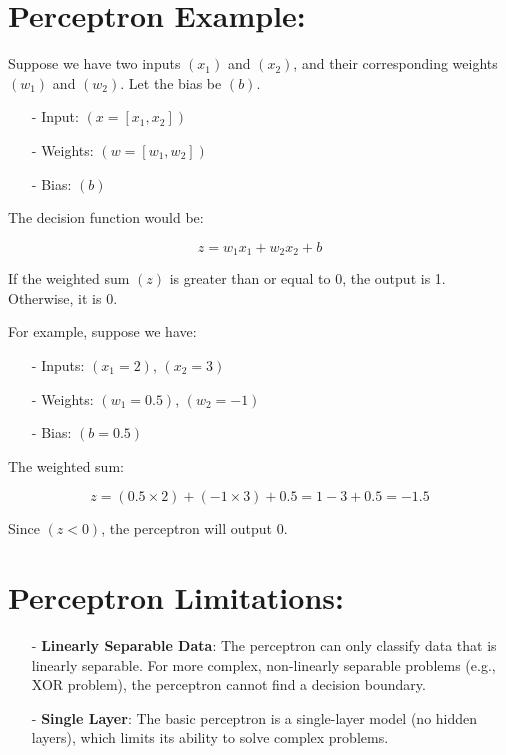 \documentclass[10pt]{article}
\begin{document}
\section{ Perceptron Example:}
Suppose we have two inputs $( x_1 )$ and $( x_2 )$, and their corresponding weights $( w_1 )$ and $( w_2 )$. Let the bias be $( b )$.

\begin{itemize}
   \item [-] Input: $( x = [x_1, x_2] )$
   \item [-] Weights: $( w = [w_1, w_2] )$
   \item [-] Bias: $( b )$
\end{itemize}

The decision function would be:

$$
z = w_1 x_1 + w_2 x_2 + b
$$

If the weighted sum $( z )$ is greater than or equal to 0, the output is 1. Otherwise, it is 0.

For example, suppose we have:

\begin{itemize}
   \item [-] Inputs: $( x_1 = 2 )$, $( x_2 = 3 )$
   \item [-] Weights: $( w_1 = 0.5 )$, $( w_2 = -1 )$
   \item [-] Bias: $( b = 0.5 )$
\end{itemize}

The weighted sum:

$$
z = (0.5 \times 2) + (-1 \times 3) + 0.5 = 1 - 3 + 0.5 = -1.5
$$

Since $( z < 0 )$, the perceptron will output 0.

\section{ Perceptron Limitations:}

\begin{itemize}
   \item [-] {\bf Linearly Separable Data}: The perceptron can only classify data that is linearly separable. For more complex, non-linearly separable problems (e.g., XOR problem), the perceptron cannot find a decision boundary.
   \item [-] {\bf Single Layer}: The basic perceptron is a single-layer model (no hidden layers), which limits its ability to solve complex problems.
\end{itemize}
\end{document}
